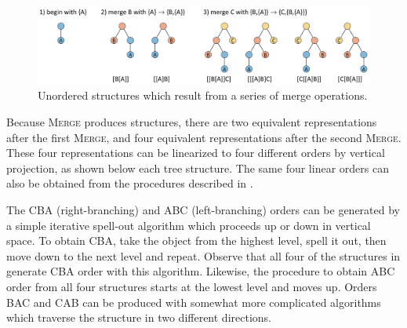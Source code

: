   
\begin{figure}
\includegraphics[width=\textwidth]{figures/Tilsen-img42.png}
\caption{Unordered structures which result from a series of merge operations.}
\label{fig:3:14}
\end{figure}
 

  Because \textsc{Merge} produces  structures, there are two equivalent representations after the first \textsc{Merge}, and four equivalent representations after the second \textsc{Merge}. These four representations can be linearized to four different orders by vertical projection, as shown below each tree structure. The same four linear orders can also be obtained from the  procedures described in {}.

  The CBA (right-branching) and ABC (left-branching) orders can be generated by a simple iterative spell-out algorithm which proceeds up or down in vertical space. To obtain CBA, take the  object from the highest level, spell it out, then move down to the next level and repeat. Observe that all four of the structures in {} generate CBA order with this algorithm. Likewise, the procedure to obtain ABC order from all four structures starts at the lowest level and moves up. Orders BAC and CAB can be produced with somewhat more complicated algorithms which traverse the structure in two different directions.

